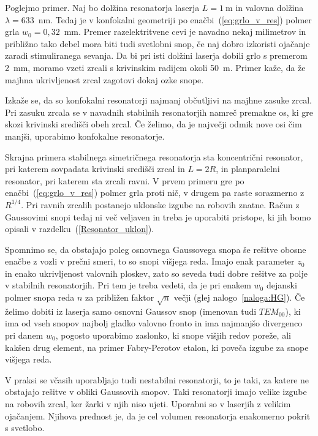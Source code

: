 Poglejmo primer. Naj bo dolžina resonatorja laserja $L=1~\si{\metre}$ in valovna
dolžina $\lambda = 633$~nm. Tedaj je v konfokalni geometriji po enačbi~(\ref{eq:grlo_v_res})
polmer grla $w_{0}=0,32$~mm. Premer razelektritvene cevi je navadno
nekaj milimetrov in približno tako debel mora biti tudi svetlobni
snop, če naj dobro izkoristi ojačanje zaradi stimuliranega sevanja.
Da bi pri isti dolžini laserja dobili grlo s premerom 2~mm, moramo vzeti
zrcali s krivinskim radijem okoli 50~m. Primer kaže, da že majhna ukrivljenost 
zrcal zagotovi dokaj ozke snope.

\begin{remark}
Izkaže se, da so konfokalni resonatorji najmanj občutljivi na majhne zasuke zrcal. 
Pri zasuku zrcala se v navadnih stabilnih resonatorjih namreč premakne os, ki gre skozi 
krivinski središči obeh zrcal. Če želimo, da je največji odmik nove osi čim
manjši, uporabimo konfokalne resonatorje. 
\end{remark}

Skrajna primera stabilnega simetričnega resonatorja sta 
koncentrični resonator,
pri katerem sovpadata krivinski središči zrcal in $L=2R$, in planparalelni 
resonator, pri katerem sta zrcali ravni.
V prvem primeru gre po enačbi~(\ref{eq:grlo_v_res}) polmer grla proti nič, v drugem pa raste sorazmerno
z $R^{1/4}$. Pri ravnih zrcalih postanejo uklonske
izgube na robovih znatne. Račun z Gaussovimi snopi tedaj ni več veljaven
in treba je uporabiti pristope, ki jih bomo opisali
v razdelku~(\ref{Resonator_uklon}).

Spomnimo se, da obstajajo poleg osnovnega Gaussovega
snopa še rešitve obosne enačbe z vozli v prečni smeri, to so snopi
višjega reda. Imajo enak parameter $z_{0}$ in enako ukrivljenost
valovnih ploskev, zato so seveda tudi dobre rešitve za polje v stabilnih
resonatorjih. Pri tem je treba vedeti, da je pri enakem $w_{0}$
dejanski polmer snopa reda $n$ za približen faktor $\sqrt{n}$ večji 
(glej nalogo~\ref{naloga:HG}). Če želimo dobiti iz laserja samo 
osnovni Gaussov snop (imenovan tudi $TEM_{00}$), ki ima od vseh snopov
najbolj gladko valovno fronto in ima najmanjšo 
divergenco pri danem $w_0$, pogosto uporabimo zaslonko, ki snope višjih redov poreže, 
ali kakšen drug element, na primer Fabry-Perotov etalon, ki poveča izgube za snope višjega reda.
 
\begin{remark}
V praksi se včasih uporabljajo tudi nestabilni resonatorji, to je
taki, za katere ne obstajajo rešitve v obliki Gaussovih snopov. Taki
resonatorji imajo velike izgube na robovih zrcal, ker žarki v njih niso ujeti. 
Uporabni so v laserjih z velikim ojačanjem. Njihova prednost je, da je cel
volumen resonatorja enakomerno pokrit s svetlobo.
\end{remark}


